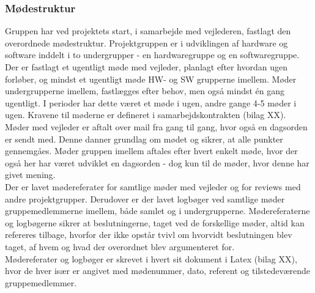 \subsubsection{Mødestruktur}
Gruppen har ved projektets start, i samarbejde med vejlederen, fastlagt den overordnede mødestruktur. Projektgruppen er i udviklingen af hardware og software inddelt i to undergrupper - en hardwaregruppe og en softwaregruppe. Der er fastlagt et ugentligt møde med vejleder, planlagt efter hvordan ugen forløber, og mindst et ugentligt møde HW- og SW grupperne imellem. Møder  undergrupperne imellem, fastlægges efter behov, men også mindst én gang ugentligt. I perioder har dette været et møde i ugen, andre gange 4-5 møder i ugen. Kravene til møderne er defineret i samarbejdskontrakten (bilag XX). \\
\newline
Møder med vejleder er aftalt over mail fra gang til gang, hvor også en dagsorden er sendt med. Denne danner grundlag om mødet og sikrer, at alle punkter gennemgåes. Møder gruppen imellem aftales efter hvert enkelt møde, hvor der også her har været udviklet en dagsorden - dog kun til de møder, hvor denne har givet mening.\\
\newline
Der er lavet mødereferater for samtlige møder med vejleder og for reviews med andre projektgrupper. Derudover er der lavet logbøger ved samtlige møder gruppemedlemmerne imellem, både samlet og i undergrupperne. Mødereferaterne og logbøgerne sikrer at beslutningerne, taget ved de forskellige møder, altid kan refereres tilbage, hvorfor der ikke opstår tvivl om hvorvidt beslutningen blev taget, af hvem og hvad der overordnet blev argumenteret for.\\
Mødereferater og logbøger er skrevet i hvert sit dokument i Latex (bilag XX), hvor de hver især er angivet med mødenummer, dato, referent og tilstedeværende gruppemedlemmer.  

